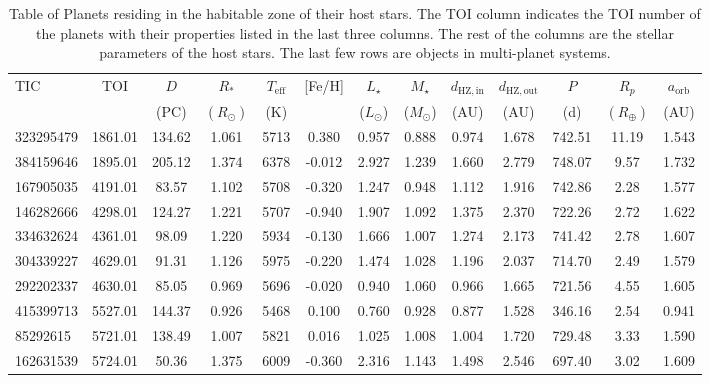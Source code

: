 \begin{sidewaystable}[htbp]
    \caption{Table of Planets residing in the habitable zone of their host stars. 
        The TOI column indicates the TOI number of the planets with their properties 
        listed in the last three columns. The rest of the columns are the stellar 
        parameters of the host stars. The last few rows are objects in multi-planet systems.}
    \label{tb:habitable_planets}
    \centering
    \small
    \begin{tabular}{lcccccccccccc}
        \toprule
        TIC  & TOI & $D$ & $R_{*}$ & $T_{\text{eff}}$ & [Fe/H] & $L_\star$ & $M_\star$ & 
        $d_\mathrm{HZ, in}$ & $d_\mathrm{HZ, out}$ & $P$ & $R_{p}$ & $a_\mathrm{orb}$ \\
        & & (PC) & $(R_{\odot})$ & (K) & & ($L_\odot$) & ($M_\odot$) & 
        (AU) & (AU) & (d) & $(R_{\oplus})$ & (AU) \\
        \hline
 323295479 & 1861.01 & 134.62 & 1.061 & 5713 & 0.380 & 
        0.957 & 0.888 & 0.974 & 1.678 & 
        742.51 & 11.19 & 1.543 \\
 384159646 & 1895.01 & 205.12 & 1.374 & 6378 & -0.012 & 
        2.927 & 1.239 & 1.660 & 2.779 & 
        748.07 & 9.57 & 1.732 \\
 167905035 & 4191.01 & 83.57 & 1.102 & 5708 & -0.320 & 
        1.247 & 0.948 & 1.112 & 1.916 & 
        742.86 & 2.28 & 1.577 \\
 146282666 & 4298.01 & 124.27 & 1.221 & 5707 & -0.940 & 
        1.907 & 1.092 & 1.375 & 2.370 & 
        722.26 & 2.72 & 1.622 \\
 334632624 & 4361.01 & 98.09 & 1.220 & 5934 & -0.130 & 
        1.666 & 1.007 & 1.274 & 2.173 & 
        741.42 & 2.78 & 1.607 \\
 304339227 & 4629.01 & 91.31 & 1.126 & 5975 & -0.220 & 
        1.474 & 1.028 & 1.196 & 2.037 & 
        714.70 & 2.49 & 1.579 \\
 292202337 & 4630.01 & 85.05 & 0.969 & 5696 & -0.020 & 
        0.940 & 1.060 & 0.966 & 1.665 & 
        721.56 & 4.55 & 1.605 \\
 415399713 & 5527.01 & 144.37 & 0.926 & 5468 & 0.100 & 
        0.760 & 0.928 & 0.877 & 1.528 & 
        346.16 & 2.54 & 0.941 \\
 85292615 & 5721.01 & 138.49 & 1.007 & 5821 & 0.016 & 
        1.025 & 1.008 & 1.004 & 1.720 & 
        729.48 & 3.33 & 1.590 \\
 162631539 & 5724.01 & 50.36 & 1.375 & 6009 & -0.360 & 
        2.316 & 1.143 & 1.498 & 2.546 & 
        697.40 & 3.02 & 1.609 \\

\end{tabular}
\end{sidewaystable}
